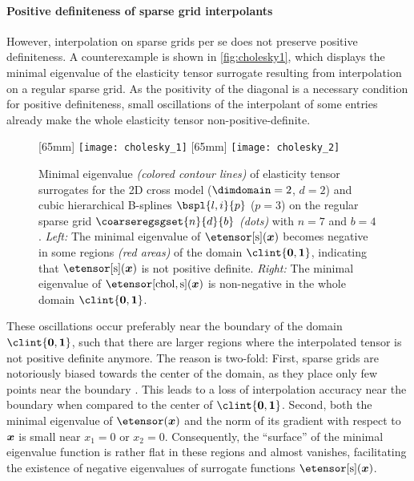 \paragraph{Positive definiteness of sparse grid interpolants}

However, interpolation on sparse grids per se does not preserve
positive definiteness.
A counterexample is shown in \cref{fig:cholesky1},
which displays the minimal eigenvalue of the elasticity tensor surrogate
resulting from interpolation on a regular sparse grid.
As the positivity of the diagonal is a necessary condition
for positive definiteness,
small oscillations of the interpolant of some entries
already make the whole elasticity tensor non-positive-definite.

\begin{figure}
  [65mm]{%
    \texttt{[image: cholesky\_1]}%
  }%
  \hfill%
  [65mm]{%
    \texttt{[image: cholesky\_2]}%
  }%
  \hfill\hfill%
  \caption[%
    Minimal eigenvalue of interpolated elasticity tensors%
  ]{%
    Minimal eigenvalue \emph{(colored contour lines)}
    of elasticity tensor surrogates
    for the 2D cross model ($\dimdomain = 2$, $d = 2$)
    and cubic hierarchical B-splines $\bspl{l,i}{p}$ ($p = 3$) on
    the regular sparse grid $\coarseregsgset{n}{d}{b}$ \emph{(dots)}
    with $n = 7$ and $b = 4$.
    \emph{Left:} The minimal eigenvalue of $\etensor[\sparse](\*x)$
    becomes negative in some regions \emph{\textcolor{C1}{(red areas)}}
    of the domain $\clint{\*0, \*1}$,
    indicating that $\etensor[\sparse](\*x)$ is not positive definite.
    \emph{Right:} The minimal eigenvalue of $\etensor[\chol,\sparse](\*x)$
    is non-negative in the whole domain $\clint{\*0, \*1}$.%
  }%
  \label{fig:cholesky}%
\end{figure}

These oscillations occur preferably near the boundary of the domain
$\clint{\*0, \*1}$, such that there are larger regions
where the interpolated tensor is not positive definite anymore.
The reason is two-fold:
First, sparse grids are notoriously biased towards the center of the domain,
as they place only few points near the boundary \cite{Pflueger10Spatially}.
This leads to a loss of interpolation accuracy near the boundary
when compared to the center of $\clint{\*0, \*1}$.
Second, both the minimal eigenvalue of $\etensor(\*x)$ and the norm of its
gradient with respect to ${\boldsymbol{x}}$ is small near $x_1 = 0$ or $x_2 = 0$.
Consequently, the ``surface'' of the minimal eigenvalue function
is rather flat in these regions and almost vanishes,
facilitating the existence of negative eigenvalues of
surrogate functions $\etensor[\sparse](\*x)$.

